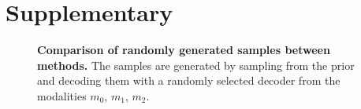 \chapter{Supplementary}
%

\begin{figure}[h!]
    \centering
    \caption{\textbf{Comparison of randomly generated samples between methods.} The samples are generated by sampling from the prior and decoding them with a randomly selected decoder from the modalities $m_0$, $m_1$, $m_2$.
    }


\end{figure}